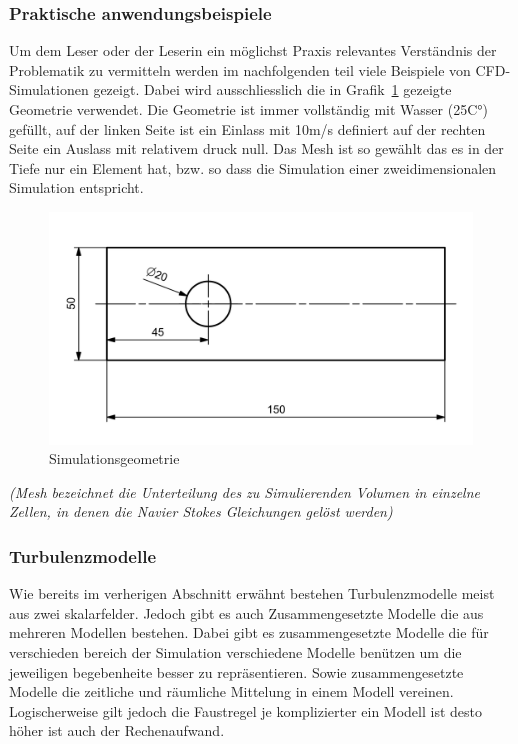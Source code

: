 \begin{refsection}



\subsubsection{Praktische anwendungsbeispiele}
\label{subsubsec:domain-desc}

Um dem Leser oder der Leserin ein möglichst Praxis relevantes Verständnis der Problematik zu vermitteln werden im nachfolgenden teil viele Beispiele von CFD-Simulationen gezeigt.
Dabei wird ausschliesslich die in Grafik~\ref{fig:SimDomain} gezeigte Geometrie verwendet.
Die Geometrie ist immer vollständig mit Wasser (25C°) gefüllt,
auf der linken Seite ist ein Einlass mit 10m/s definiert auf der rechten Seite ein Auslass mit relativem druck null.
Das Mesh ist so gewählt das es in der Tiefe nur ein Element hat, bzw. so dass die Simulation einer zweidimensionalen Simulation entspricht.

\begin{figure}
    \includegraphics[width=\textwidth]{papers/reynolds/images/domain.png}
    \caption{Simulationsgeometrie}
    \label{fig:SimDomain}
\end{figure}

\textit{(Mesh bezeichnet die Unterteilung des zu Simulierenden Volumen in einzelne Zellen, in denen die Navier Stokes Gleichungen gelöst werden)}

\subsubsection{Turbulenzmodelle}

Wie bereits im verherigen Abschnitt erwähnt bestehen Turbulenzmodelle meist aus zwei skalarfelder.
Jedoch gibt es auch Zusammengesetzte Modelle die aus mehreren Modellen bestehen.
Dabei gibt es zusammengesetzte Modelle die für verschieden bereich der Simulation verschiedene Modelle benützen um die jeweiligen begebenheite besser zu repräsentieren.
Sowie zusammengesetzte Modelle die zeitliche und räumliche Mittelung in einem Modell vereinen.
Logischerweise gilt jedoch die Faustregel je komplizierter ein Modell ist desto höher ist auch der Rechenaufwand.


\end{refsection}
